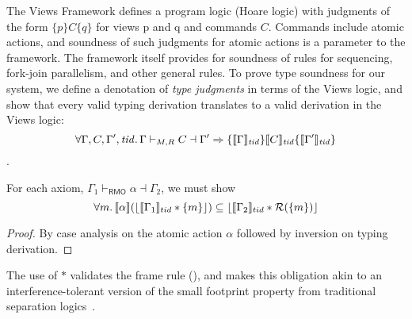 The Views Framework defines a program logic (Hoare logic) with judgments of the form $\{ p \} C \{ q \}$ for views p and q and commands $C$.  Commands include atomic actions, and soundness of such judgments for atomic actions is a parameter to the framework.  The framework itself provides for soundness of rules for sequencing, fork-join parallelism, and other general rules.
To prove type soundness for our system, we define a denotation of \emph{type judgments} in terms of the Views logic, and show that every valid  typing derivation translates to a valid derivation in the Views logic:
\[\forall\Gamma,C,\Gamma',\mathit{tid}\ldotp\Gamma\vdash_{M,R} C\dashv \Gamma' \Rightarrow \{\llbracket\Gamma\rrbracket_\mathit{tid}\} \llbracket C\rrbracket_\mathit{tid}\{\llbracket\Gamma'\rrbracket_\mathit{tid}\}\].
\begin{theorem}
For each axiom, $\Gamma_{1} \vdash_{\textsf{RMO}} \alpha \dashv \Gamma_{2}$, we must show
\[
\forall m\ldotp   \llbracket \alpha \rrbracket  (\lfloor \llbracket \Gamma_{1} \rrbracket_{tid}  * \{m\} \rfloor )\subseteq  \lfloor \llbracket \Gamma_{2} \rrbracket_{tid} * \mathcal{R}(\{m\}) \rfloor
\]
\end{theorem}
\begin{proof}
By case analysis on the atomic action $\alpha$ followed by inversion on typing derivation.
\end{proof}
The use of $*$ validates the frame rule (), and makes this obligation akin to an interference-tolerant version of the small footprint property from traditional separation logics~.
